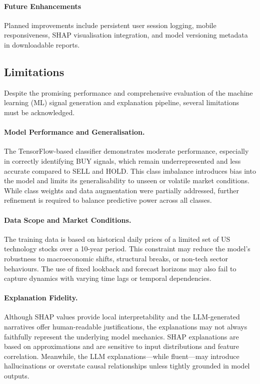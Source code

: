 \paragraph{Future Enhancements}  
Planned improvements include persistent user session logging, mobile responsiveness, SHAP visualisation integration, and model versioning metadata in downloadable reports.

\subsection{Limitations}

Despite the promising performance and comprehensive evaluation of the machine learning (ML) signal generation and explanation pipeline, several limitations must be acknowledged.

\paragraph{Model Performance and Generalisation.}  
The TensorFlow-based classifier demonstrates moderate performance, especially in correctly identifying BUY signals, which remain underrepresented and less accurate compared to SELL and HOLD. This class imbalance introduces bias into the model and limits its generalisability to unseen or volatile market conditions. While class weights and data augmentation were partially addressed, further refinement is required to balance predictive power across all classes.

\paragraph{Data Scope and Market Conditions.}  
The training data is based on historical daily prices of a limited set of US technology stocks over a 10-year period. This constraint may reduce the model’s robustness to macroeconomic shifts, structural breaks, or non-tech sector behaviours. The use of fixed lookback and forecast horizons may also fail to capture dynamics with varying time lags or temporal dependencies.

\paragraph{Explanation Fidelity.}  
Although SHAP values provide local interpretability and the LLM-generated narratives offer human-readable justifications, the explanations may not always faithfully represent the underlying model mechanics. SHAP explanations are based on approximations and are sensitive to input distributions and feature correlation. Meanwhile, the LLM explanations—while fluent—may introduce hallucinations or overstate causal relationships unless tightly grounded in model outputs.

